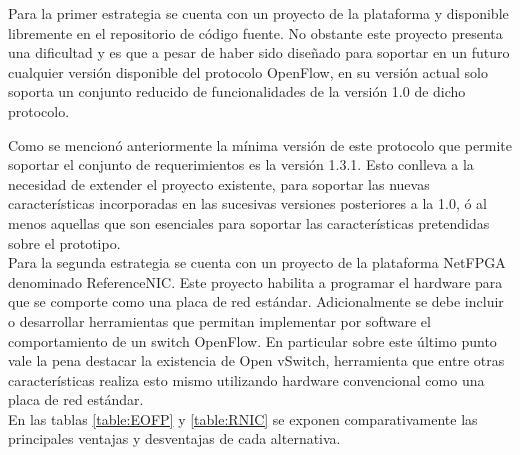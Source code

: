 Para la primer estrategia se cuenta con un proyecto de la plataforma y disponible libremente en el repositorio de c\'odigo fuente. No obstante este proyecto presenta una dificultad y es que a pesar de haber sido dise\~nado para soportar en un futuro cualquier versi\'on disponible del protocolo OpenFlow, en su versi\'on actual solo soporta un conjunto reducido de funcionalidades de la versi\'on 1.0 de dicho protocolo. 

Como se mencion\'o anteriormente la m\'inima versi\'on de este protocolo que permite soportar el conjunto de requerimientos es la versi\'on 1.3.1. Esto conlleva a la necesidad de extender el proyecto existente, para soportar las nuevas caracter\'isticas incorporadas en las sucesivas versiones posteriores a la 1.0, \'o al menos aquellas que son esenciales para soportar las caracter\'isticas pretendidas sobre el prototipo.\\

Para la segunda estrategia se cuenta con un proyecto de la plataforma NetFPGA denominado ReferenceNIC. Este proyecto habilita a programar el hardware para que se comporte como una placa de red estándar. Adicionalmente se debe incluir o desarrollar herramientas que permitan implementar por software el comportamiento de un switch OpenFlow. En particular sobre este \'ultimo punto vale la pena destacar la existencia de Open vSwitch, herramienta que entre otras caracter\'isticas realiza esto mismo utilizando hardware convencional como una placa de red estándar.\\

En las tablas \ref{table:EOFP} y \ref{table:RNIC} se exponen comparativamente las principales ventajas y desventajas de cada alternativa.

